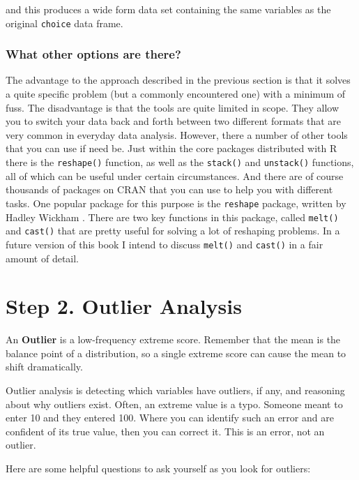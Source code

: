 \documentclass[
]{book}
\begin{document}
and this produces a wide form data set containing the same variables as the original \texttt{choice} data frame.

\hypertarget{what-other-options-are-there}{%
\subsubsection{What other options are there?}\label{what-other-options-are-there}}

The advantage to the approach described in the previous section is that it solves a quite specific problem (but a commonly encountered one) with a minimum of fuss. The disadvantage is that the tools are quite limited in scope. They allow you to switch your data back and forth between two different formats that are very common in everyday data analysis. However, there a number of other tools that you can use if need be. Just within the core packages distributed with R there is the \texttt{reshape()} function, as well as the \texttt{stack()} and \texttt{unstack()} functions, all of which can be useful under certain circumstances. And there are of course thousands of packages on CRAN that you can use to help you with different tasks. One popular package for this purpose is the \texttt{reshape} package, written by Hadley Wickham \citet[for details see Wickham2007]{ref}. There are two key functions in this package, called \texttt{melt()} and \texttt{cast()} that are pretty useful for solving a lot of reshaping problems. In a future version of this book I intend to discuss \texttt{melt()} and \texttt{cast()} in a fair amount of detail.

\hypertarget{step-2.-outlier-analysis}{%
\section{Step 2. Outlier Analysis}\label{step-2.-outlier-analysis}}

An \textbf{Outlier} is a low-frequency extreme score. Remember that the mean is the balance point of a distribution, so a single extreme score can cause the mean to shift dramatically.

Outlier analysis is detecting which variables have outliers, if any, and reasoning about why outliers exist. Often, an extreme value is a typo. Someone meant to enter 10 and they entered 100. Where you can identify such an error and are confident of its true value, then you can correct it. This is an error, not an outlier.

Here are some helpful questions to ask yourself as you look for outliers:
\end{document}
